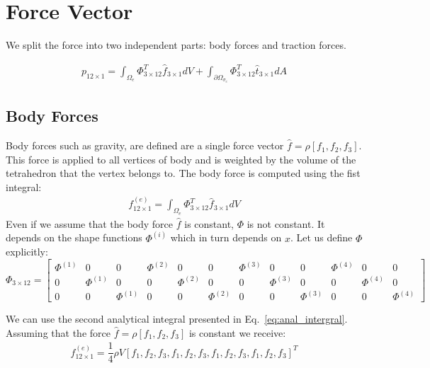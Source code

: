 \documentclass[en]{minipw} %
\begin{document}
\section{Force Vector}
We split the force into two independent parts: body forces and traction forces.

\begin{equation}
\begin{aligned}
p_{12 \times 1} = \int_{\Omega_{e}} \Phi_{3 \times 12}^{T} \hat{f}_{3 \times 1} dV + \int_{\partial \Omega_{\sigma_{e}}} \Phi_{3 \times 12}^{T} \hat{t}_{3 \times 1} dA
\end{aligned}
\end{equation}

\subsection{Body Forces}
Body forces such as gravity, are defined are a single force vector $\hat{f} = \rho[f_1, f_2, f_3]$. This force is applied to all vertices of body and is weighted by the volume of the tetrahedron that the vertex belongs to.
The body force is computed using the fist integral:
\begin{equation}
\begin{aligned}
f^{(e)}_{12 \times 1} = \int_{\Omega_{e}} \Phi_{3 \times 12}^{T} \hat{f}_{3 \times 1} dV
\end{aligned}
\end{equation}
Even if we assume that the body force $\hat{f}$ is constant, $\Phi$ is not constant. It depends on the shape functions $\Phi^{(i)}$ which in turn depends on $x$. Let us define $\Phi$ explicitly:
\begin{equation}
\Phi_{3 \times 12} =
\begin{bmatrix}
\Phi^{(1)} & 0 & 0 & \Phi^{(2)} & 0 & 0 & \Phi^{(3)} & 0 & 0 & \Phi^{(4)} & 0 & 0 \\
0 & \Phi^{(1)} & 0 & 0 & \Phi^{(2)} & 0 & 0 & \Phi^{(3)} & 0 & 0 & \Phi^{(4)} & 0 \\
0 & 0 & \Phi^{(1)} & 0 & 0 & \Phi^{(2)} & 0 & 0 & \Phi^{(3)} & 0 & 0 & \Phi^{(4)} 
\end{bmatrix}
\end{equation}

We can use the second analytical integral presented in Eq.~\ref{eq:anal_intergral}. Assuming that the force $\hat{f} = \rho[f_1, f_2, f_3]$ is constant we receive:
\begin{equation}
\begin{aligned}
f^{(e)}_{12 \times 1} = \dfrac{1}{4} \rho V [f_1, f_2, f_3, f_1, f_2, f_3, f_1, f_2, f_3,f_1, f_2, f_3]^{T} 
\end{aligned}
\end{equation}
\end{document}
